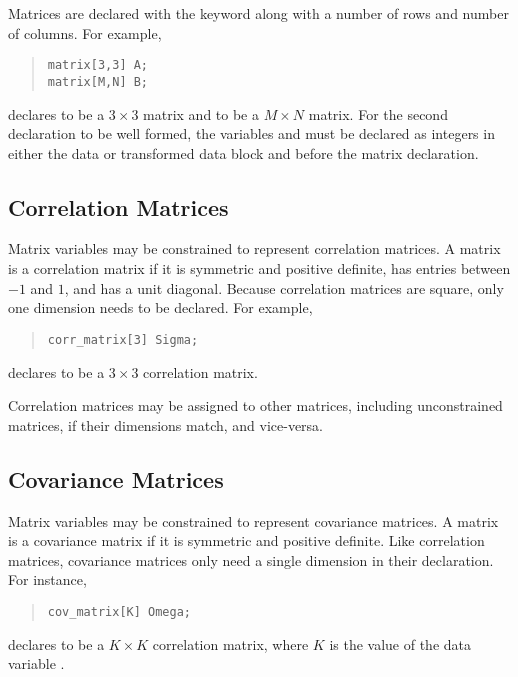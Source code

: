 Matrices are declared with the keyword  along with a
number of rows and number of columns.  For example, 
%
\begin{quote}
\begin{Verbatim}  
matrix[3,3] A;  
matrix[M,N] B;
\end{Verbatim}
\end{quote}
%  
declares  to be a $3 \times 3$ matrix and  to be a $M
\times N$ matrix.  For the second declaration to be well formed, the
variables  and  must be declared as integers in either
the data or transformed data block and before the matrix declaration.

\subsection{Correlation Matrices}

Matrix variables may be constrained to represent correlation matrices.
A matrix is a correlation matrix if it is symmetric and positive
definite, has entries between $-1$ and $1$, and has a unit diagonal.
Because correlation matrices are square, only one dimension needs
to be declared.  For example,
%
\begin{quote}
\begin{Verbatim} 
corr_matrix[3] Sigma;
\end{Verbatim}
\end{quote}
% 
declares  to be a $3 \times 3$ correlation matrix.

Correlation matrices may be assigned to other matrices, including
unconstrained matrices, if their dimensions match, and vice-versa.

\subsection{Covariance Matrices}

Matrix variables may be constrained to represent covariance matrices.
A matrix is a covariance matrix if it is symmetric and positive
definite.  Like correlation matrices, covariance matrices only need a
single dimension in their declaration.  For instance,
%
\begin{quote}
\begin{Verbatim} 
cov_matrix[K] Omega;
\end{Verbatim}
\end{quote}
% 
declares  to be a $K \times K$ correlation matrix, where
$K$ is the value of the data variable .  

